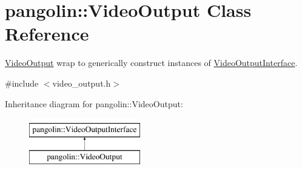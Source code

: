 \hypertarget{classpangolin_1_1_video_output}{}\section{pangolin\+:\+:Video\+Output Class Reference}
\label{classpangolin_1_1_video_output}


\hyperlink{classpangolin_1_1_video_output}{Video\+Output} wrap to generically construct instances of \hyperlink{structpangolin_1_1_video_output_interface}{Video\+Output\+Interface}.  




{\ttfamily \#include $<$video\+\_\+output.\+h$>$}

Inheritance diagram for pangolin\+:\+:Video\+Output\+:\begin{figure}[H]
\begin{center}
\leavevmode
\includegraphics[height=2.000000cm]{classpangolin_1_1_video_output}
\end{center}
\end{figure}
